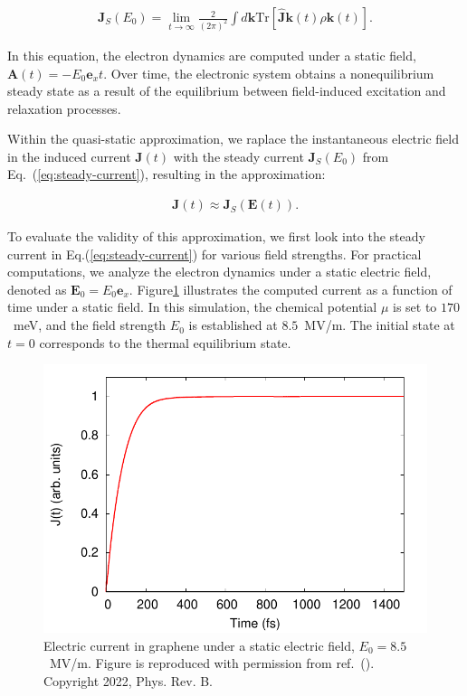 \begin{align}
	\mathbf J_S(E_0) = \lim_{t\rightarrow \infty}\frac{2}{(2\pi)^2}\int d\mathbf k \mathrm{Tr}\left[\hat{\boldsymbol{J}}{\boldsymbol{k}}(t)\rho{\boldsymbol{k}}(t)\right].
	\label{eq:steady-current}
\end{align}

In this equation, the electron dynamics are computed under a static field, $\mathbf{A}(t)=-E_0
	\mathbf{e}_x t$. Over time, the electronic system obtains a nonequilibrium steady state as a result
of the equilibrium between field-induced excitation and relaxation processes.

Within the quasi-static approximation, we raplace the instantaneous electric field in the induced current $\mathbf J(t)$ with the steady current $\mathbf J_S(E_0)$ from Eq.~(\ref{eq:steady-current}), resulting in the approximation:

\begin{align}
	\mathbf J(t)\approx \mathbf J_S\left( \mathbf E(t) \right).
	\label{eq:appendix-steady-current}
\end{align}

To evaluate the validity of this approximation, we first look into the steady current in
Eq.(\ref{eq:steady-current}) for various field strengths. For practical computations, we analyze
the electron dynamics under a static electric field, denoted as $\mathbf E_0=E_0\mathbf e_x$.
Figure\ref{fig:steady} illustrates the computed current as a function of time under a static field. In this simulation, the chemical potential $\mu$ is set to $170$~meV, and the field strength $E_0$ is established at $8.5$~MV/m. The initial state at $t=0$ corresponds to the thermal equilibrium state.
\begin{figure}[htbp]
	\centering
	\includegraphics[width=0.8\linewidth]{pic/steady_current_appendix.pdf}
	\caption{\label{fig:steady}
		Electric current in graphene under a static electric field, $E_0=8.5$~MV/m. Figure is reproduced with permission from ref.~(\cite{PhysRevB.106.024313}). Copyright 2022, Phys. Rev. B.}
\end{figure}

